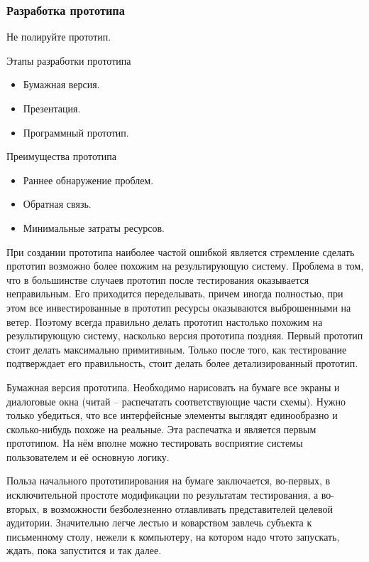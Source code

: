 \documentclass{../industrial-development}
\begin{document}
\begin{frame} \frametitle{Разработка прототипа}
  \begin{block}{}
   Не полируйте прототип. 
  \end{block}

  \begin{block}{Этапы разработки прототипа}
   \begin{itemize}
   \item Бумажная версия.
   \item Презентация.
   \item Программный прототип.
   \end{itemize}
  \end{block}
  
  \begin{block}{Преимущества прототипа}
   \begin{itemize}
   \item Раннее обнаружение проблем.
   \item Обратная связь.
   \item Минимальные затраты ресурсов.
   \end{itemize}
  \end{block}
\end{frame}

\lecturenotes

При создании прототипа наиболее частой ошибкой является стремление сделать прототип возможно более похожим на результирующую систему. Проблема в том, что в большинстве случаев прототип после тестирования оказывается неправильным. Его приходится переделывать, причем иногда полностью, при этом все инвестированные в прототип ресурсы оказываются выброшенными на ветер. Поэтому всегда правильно делать прототип настолько похожим на результирующую систему, насколько версия прототипа поздняя. Первый прототип стоит делать максимально примитивным. Только после того, как тестирование подтверждает его правильность, стоит делать более детализированный прототип.

Бумажная версия прототипа. Необходимо нарисовать на бумаге все экраны и диалоговые окна (читай – распечатать соответствующие части схемы). Нужно только убедиться, что все интерфейсные элементы выглядят единообразно и сколько-нибудь похоже на реальные. Эта распечатка и является первым прототипом. На нём вполне можно тестировать восприятие системы пользователем и её основную логику.

Польза начального прототипирования на бумаге заключается, во-первых, в исключительной простоте модификации по результатам тестирования, а во-вторых, в возможности безболезненно отлавливать представителей целевой аудитории. Значительно легче лестью и коварством завлечь субъекта к письменному столу, нежели к компьютеру, на котором надо чтото запускать, ждать, пока запустится и так далее.
\end{document}
